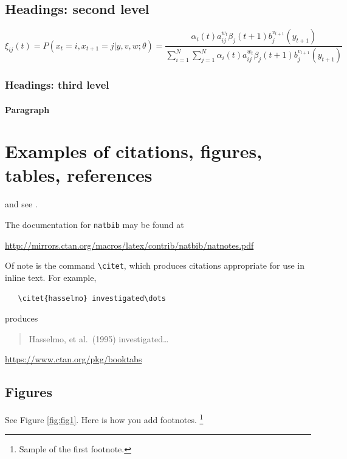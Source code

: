 \documentclass{article}
\begin{document}
\subsection{Headings: second level}
\lipsum[5]
\begin{equation}
\xi _{ij}(t)=P(x_{t}=i,x_{t+1}=j|y,v,w;\theta)= {\frac {\alpha _{i}(t)a^{w_t}_{ij}\beta _{j}(t+1)b^{v_{t+1}}_{j}(y_{t+1})}{\sum _{i=1}^{N} \sum _{j=1}^{N} \alpha _{i}(t)a^{w_t}_{ij}\beta _{j}(t+1)b^{v_{t+1}}_{j}(y_{t+1})}}
\end{equation}

\subsubsection{Headings: third level}
\lipsum[6]

\paragraph{Paragraph}
\lipsum[7]

\section{Examples of citations, figures, tables, references}
\label{sec:others}
\lipsum[8] \cite{kour2014real,kour2014fast} and see \cite{hadash2018estimate}.

The documentation for \verb+natbib+ may be found at
\begin{center}
  \url{http://mirrors.ctan.org/macros/latex/contrib/natbib/natnotes.pdf}
\end{center}
Of note is the command \verb+\citet+, which produces citations
appropriate for use in inline text.  For example,
\begin{verbatim}
   \citet{hasselmo} investigated\dots
\end{verbatim}
produces
\begin{quote}
  Hasselmo, et al.\ (1995) investigated\dots
\end{quote}

\begin{center}
  \url{https://www.ctan.org/pkg/booktabs}
\end{center}


\subsection{Figures}
\lipsum[10] 
See Figure \ref{fig:fig1}. Here is how you add footnotes. \footnote{Sample of the first footnote.}
\lipsum[11] 
\end{document}
